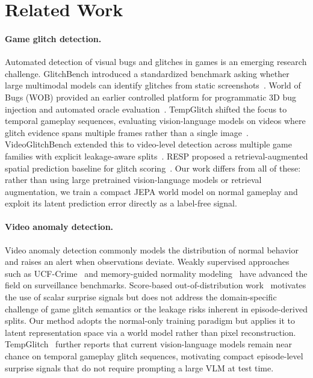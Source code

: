 \section{Related Work}
\label{sec:related-work}

\paragraph{Game glitch detection.}
Automated detection of visual bugs and glitches in games is an emerging research challenge.
GlitchBench introduced a standardized benchmark asking whether large multimodal models can
identify glitches from static screenshots~\cite{glitchbench}. World of Bugs (WOB) provided an
earlier controlled platform for programmatic 3D bug injection and automated oracle
evaluation~\cite{worldofbugs}. TempGlitch shifted the focus to temporal gameplay sequences,
evaluating vision-language models on videos where glitch evidence spans multiple frames rather
than a single image~\cite{tempglitch}. VideoGlitchBench extended this to video-level
detection across multiple game families with explicit leakage-aware splits~\cite{videoglitchbench}.
RESP proposed a retrieval-augmented spatial prediction baseline for glitch scoring~\cite{resp}.
Our work differs from all of these: rather than using large pretrained
vision-language models or retrieval augmentation, we train a compact JEPA world model on
normal gameplay and exploit its latent prediction error directly as a label-free signal.

\paragraph{Video anomaly detection.}
Video anomaly detection commonly models the distribution of normal behavior and raises an alert
when observations deviate. Weakly supervised approaches such as UCF-Crime~\cite{sultani2018ucfcrime}
and memory-guided normality modeling~\cite{park2020mnad} have advanced the field on surveillance
benchmarks. Score-based out-of-distribution work~\cite{hendrycks2017baseline,guo2017calibration}
motivates the use of scalar surprise signals but does not address the domain-specific challenge
of game glitch semantics or the leakage risks inherent in episode-derived splits. Our method adopts the
normal-only training paradigm but applies it to latent representation space via a world model
rather than pixel reconstruction.
TempGlitch~\cite{tempglitch} further reports that current vision-language models remain near
chance on temporal gameplay glitch sequences, motivating compact episode-level surprise signals
that do not require prompting a large VLM at test time.

